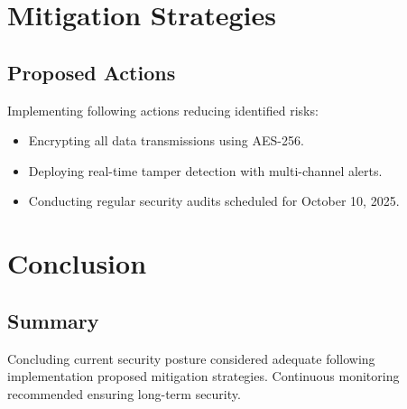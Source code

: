 \documentclass[a4paper,12pt]{report}
\begin{document}
\chapter{Mitigation Strategies}
\section{Proposed Actions}
Implementing following actions reducing identified risks:
\begin{itemize}[leftmargin=*]
    \item Encrypting all data transmissions using AES-256.
    \item Deploying real-time tamper detection with multi-channel alerts.
    \item Conducting regular security audits scheduled for October 10, 2025.
\end{itemize}

\chapter{Conclusion}
\section{Summary}
Concluding current security posture considered adequate following implementation proposed mitigation strategies. Continuous monitoring recommended ensuring long-term security.
\end{document}
